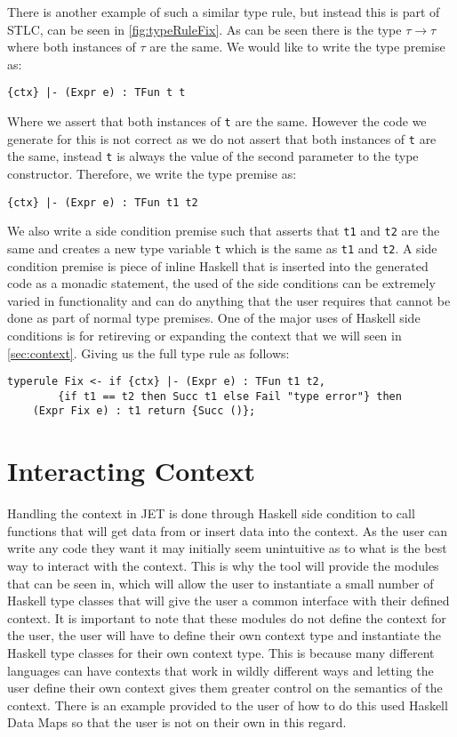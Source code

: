 There is another example of such a similar type rule, but instead this is part of STLC, can be seen in \autoref{fig:typeRuleFix}.
As can be seen there is the type $\tau \rightarrow \tau$ where both instances of $\tau$ are the same.
We would like to write the type premise as:
\begin{lstlisting}[numbers=none]
{ctx} |- (Expr e) : TFun t t
\end{lstlisting}
Where we assert that both instances of \texttt{t} are the same.
However the code we generate for this is not correct as we do not assert that both instances of \texttt{t} are the same, instead \texttt{t} is always the value of the second parameter to the type constructor.
Therefore, we write the type premise as:
\begin{lstlisting}
{ctx} |- (Expr e) : TFun t1 t2
\end{lstlisting}
We also write a side condition premise such that asserts that \texttt{t1} and \texttt{t2} are the same and creates a new type variable \texttt{t} which is the same as \texttt{t1} and \texttt{t2}.
A side condition premise is piece of inline Haskell that is inserted into the generated code as a monadic statement, the used of the side conditions can be extremely varied in functionality and can do anything that the user requires that cannot be done as part of normal type premises.
One of the major uses of Haskell side conditions is for retireving or expanding the context that we will seen in \autoref{sec:context}.
Giving us the full type rule as follows:
\begin{lstlisting}
typerule Fix <- if {ctx} |- (Expr e) : TFun t1 t2, 
        {if t1 == t2 then Succ t1 else Fail "type error"} then 
    (Expr Fix e) : t1 return {Succ ()};
\end{lstlisting}

\section{Interacting Context}
\label{sec:context}
Handling the context in JET is done through Haskell side condition to call functions that will get data from or insert data into the context.
As the user can write any code they want it may initially seem unintuitive as to what is the best way to interact with the context.
This is why the tool will provide the modules that can be seen in, which will allow the user to instantiate a small number of Haskell type classes that will give the user a common interface with their defined context.
It is important to note that these modules do not define the context for the user, the user will have to define their own context type and instantiate the Haskell type classes for their own context type.
This is because many different languages can have contexts that work in wildly different ways and letting the user define their own context gives them greater control on the semantics of the context.
There is an example provided to the user of how to do this used Haskell Data Maps so that the user is not on their own in this regard.
